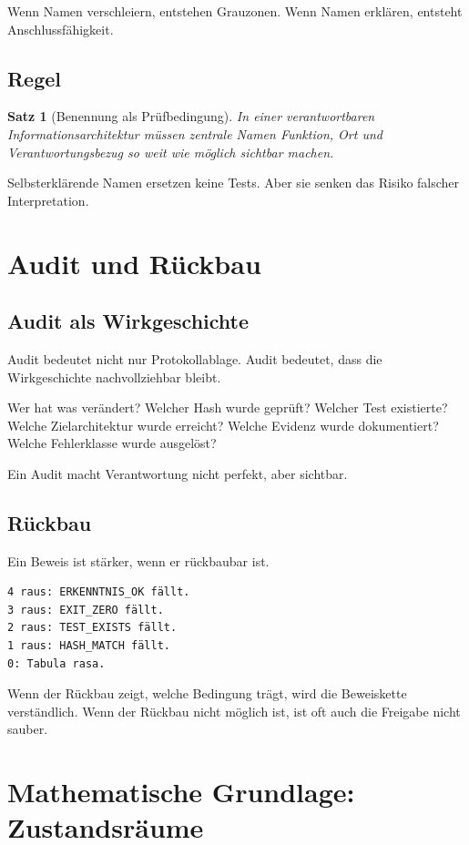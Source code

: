 \documentclass[11pt,a4paper,oneside]{book}
\newtheorem{satz}{Satz}[chapter]
\begin{document}
Wenn Namen verschleiern, entstehen Grauzonen. Wenn Namen erklären, entsteht Anschlussfähigkeit.

\section{Regel}

\begin{satz}[Benennung als Prüfbedingung]
In einer verantwortbaren Informationsarchitektur müssen zentrale Namen Funktion, Ort und Verantwortungsbezug so weit wie möglich sichtbar machen.
\end{satz}

Selbsterklärende Namen ersetzen keine Tests. Aber sie senken das Risiko falscher Interpretation.

\chapter{Audit und Rückbau}

\section{Audit als Wirkgeschichte}

Audit bedeutet nicht nur Protokollablage. Audit bedeutet, dass die Wirkgeschichte nachvollziehbar bleibt.

Wer hat was verändert? Welcher Hash wurde geprüft? Welcher Test existierte? Welche Zielarchitektur wurde erreicht? Welche Evidenz wurde dokumentiert? Welche Fehlerklasse wurde ausgelöst?

Ein Audit macht Verantwortung nicht perfekt, aber sichtbar.

\section{Rückbau}

Ein Beweis ist stärker, wenn er rückbaubar ist.

\begin{lstlisting}
4 raus: ERKENNTNIS_OK fällt.
3 raus: EXIT_ZERO fällt.
2 raus: TEST_EXISTS fällt.
1 raus: HASH_MATCH fällt.
0: Tabula rasa.
\end{lstlisting}

Wenn der Rückbau zeigt, welche Bedingung trägt, wird die Beweiskette verständlich. Wenn der Rückbau nicht möglich ist, ist oft auch die Freigabe nicht sauber.

\chapter{Mathematische Grundlage: Zustandsräume}
\end{document}
